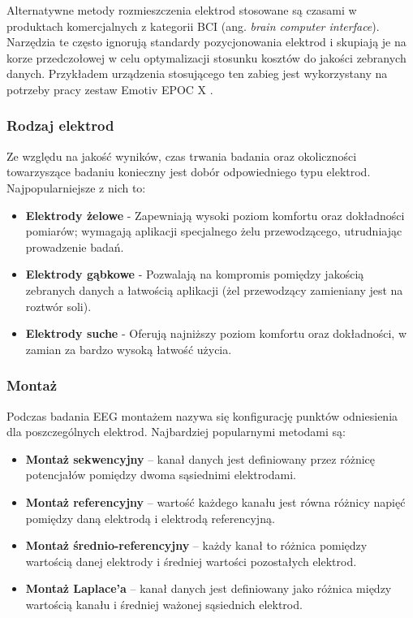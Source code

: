 \documentclass{./assets/wfis}
\begin{document}
Alternatywne metody rozmieszczenia elektrod stosowane są czasami w produktach komercjalnych z kategorii BCI (ang. \textit{brain computer interface}). Narzędzia te często ignorują standardy pozycjonowania elektrod i skupiają je na korze przedczołowej w celu optymalizacji stosunku kosztów do jakości zebranych danych. Przykładem urządzenia stosującego ten zabieg jest wykorzystany na potrzeby pracy zestaw Emotiv EPOC X \cite{emotiv_inc_epoc_nodate}. 


\subsubsection{Rodzaj elektrod}
Ze względu na jakość wyników, czas trwania badania oraz okoliczności towarzyszące badaniu konieczny jest dobór odpowiedniego typu elektrod. Najpopularniejsze z nich to:

\begin{itemize}
    \item \textbf{Elektrody żelowe} - Zapewniają wysoki poziom komfortu oraz dokładności pomiarów; wymagają aplikacji specjalnego żelu przewodzącego, utrudniając prowadzenie badań.
    \item \textbf{Elektrody gąbkowe} - Pozwalają na kompromis pomiędzy jakością zebranych danych a łatwością aplikacji (żel przewodzący zamieniany jest na roztwór soli).
    \item \textbf{Elektrody suche} - Oferują najniższy poziom komfortu oraz dokładności, w zamian za bardzo wysoką łatwość użycia.
\end{itemize}

\subsubsection{Montaż}
Podczas badania EEG montażem nazywa się konfigurację punktów odniesienia dla poszczególnych elektrod. Najbardziej popularnymi metodami są:
\begin{itemize}
    \item \textbf{Montaż sekwencyjny} – kanał danych jest definiowany przez różnicę potencjałów pomiędzy dwoma sąsiednimi elektrodami.
    \item \textbf{Montaż referencyjny} – wartość każdego kanału jest równa różnicy napięć pomiędzy daną elektrodą i elektrodą referencyjną.
    \item \textbf{Montaż średnio-referencyjny} – każdy kanał to różnica pomiędzy wartością danej elektrody i średniej wartości pozostałych elektrod. 
    \item \textbf{Montaż Laplace’a} – kanał danych jest definiowany jako różnica między wartością kanału i średniej ważonej sąsiednich elektrod.
\end{itemize}
\end{document}
